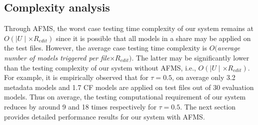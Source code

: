 {\subsection{Complexity analysis} 
\label{sec:speedupcomplexity} 
Through AFMS, the worst case testing time complexity of our system remains at $O(\mid\!\!U\!\!\mid \times R_{edit})$ since it is possible that all models in a share may be applied on the test files. However, the average case testing time complexity is $O($\textit{average number of models triggered per file}$ \times R_{edit})$. The latter may be significantly lower than the testing complexity of our system without AFMS, i.e.,  $O(\mid\!\!U\!\!\mid \times R_{edit})$. For example, it is empirically observed that for $\tau =0.5$, on average only 3.2 metadata models and 1.7 CF models are applied on test files out of 30 evaluation models. Thus on average, the testing computational requirement of our system reduces by around 9 and 18 times respectively for $\tau=0.5$. The next section provides detailed performance results for our system with AFMS. 
}

